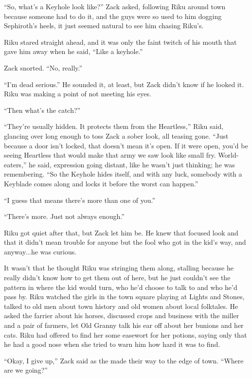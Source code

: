 \scenechange


``So, what's a Keyhole look like?'' Zack asked, following Riku around town because someone had to do it, and the guys were so used to him dogging Sephiroth's heels, it just seemed natural to see him chasing Riku's.

Riku stared straight ahead, and it was only the faint twitch of his mouth that gave him away when he said, ``Like a keyhole.''

Zack snorted. ``No, really.''

``I'm dead serious.'' He sounded it, at least, but Zack didn't know if he looked it. Riku was making a point of not meeting his eyes.

``Then what's the catch?''

``They're usually hidden. It protects them from the Heartless,'' Riku said, glancing over long enough to toss Zack a sober look, all teasing gone. ``Just because a door isn't locked, that doesn't mean it's open. If it were open, you'd be seeing Heartless that would make that army we saw look like small fry. World-eaters,'' he said, expression going distant, like he wasn't just thinking; he was remembering. ``So the Keyhole hides itself, and with any luck, somebody with a Keyblade comes along and locks it before the worst can happen.''

``I guess that means there's more than one of you.''

``There's more. Just not always enough.''

Riku got quiet after that, but Zack let him be. He knew that focused look and that it didn't mean trouble for anyone but the fool who got in the kid's way, and anyway...he was curious.

It wasn't that he thought Riku was stringing them along, stalling because he really didn't know how to get them out of here, but he just couldn't see the pattern in where the kid would turn, who he'd choose to talk to and who he'd pass by. Riku watched the girls in the town square playing at Lights and Stones, talked to old men about town history and old women about local folktales. He asked the farrier about his horses, discussed crops and business with the miller and a pair of farmers, let Old Granny talk his ear off about her bunions and her cats. Riku had offered to find her some easewort for her potions, saying only that he had a good nose when she tried to warn him how hard it was to find.

``Okay, I give up,'' Zack said as the made their way to the edge of town. ``Where are we going?''

